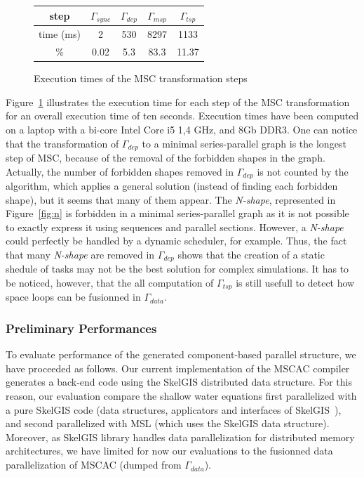 \begin{figure}[!h]
 \begin{center}
 \begin{tabular}{|c|c|c|c|c|}
  \hline
   step & $\Gamma_{sync}$ & $\Gamma_{dep}$ & $\Gamma_{msp}$ & $\Gamma_{tsp}$\\
   \hline
   time (ms) & 2 & 530 & 8297 & 1133\\
   \hline
   \% & 0.02 & 5.3 & 83.3 & 11.37\\
   \hline
 \end{tabular}
\caption{Execution times of the MSC transformation steps}
\label{fig:exectime}
 \end{center}
\end{figure}

Figure~\ref{fig:exectime} illustrates the execution time for each step of the MSC transformation for an overall execution time of ten seconds. Execution times have been computed on a laptop with a bi-core Intel Core i5 1,4 GHz, and 8Gb DDR3. 
One can notice that the transformation of $\Gamma_{dep}$ to a minimal series-parallel graph is the longest step of MSC, because of the removal of the forbidden shapes in the graph. Actually, the number of forbidden shapes removed in $\Gamma_{dep}$ is not counted by the algorithm, which applies a general solution (instead of finding each forbidden shape), but it seems that many of them appear. The \emph{N-shape}, represented in Figure~\ref{fig:n} is forbidden in a minimal series-parallel graph as it is not possible to exactly express it using sequences and parallel sections. However, a \emph{N-shape} could perfectly be handled by a dynamic scheduler, for example.
Thus, the fact that many \emph{N-shape} are removed in $\Gamma_{dep}$ shows that the creation of a static shedule of tasks may not be the best solution for complex simulations. It has to be noticed, however, that the all computation of $\Gamma_{tsp}$ is still usefull to detect how space loops can be fusionned in $\Gamma_{data}$.

\subsubsection*{Preliminary Performances}
To evaluate performance of the generated component-based parallel structure, we have proceeded as follows. Our current implementation of the MSCAC compiler generates a back-end code using the SkelGIS distributed data structure. For this reason, our evaluation compare the shallow water equations first parallelized with a pure SkelGIS code (data structures, applicators and interfaces of SkelGIS~\cite{CPE:CPE3494}), and second parallelized with MSL (which uses the SkelGIS data structure). Moreover, as SkelGIS library handles data parallelization for distributed memory architectures, we have limited for now our evaluations to the fusionned data parallelization of MSCAC (dumped from $\Gamma_{data}$). 

